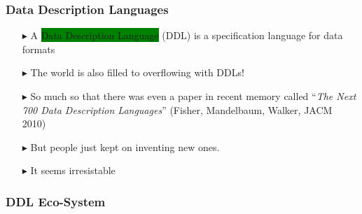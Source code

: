 \documentclass{beamer}
\newcommand{\gemph}[1]{\colorbox{green}{#1}}
\begin{document}
\begin{frame}\frametitle{Data Description Languages}

\begin{itemize}

\item [$\blacktriangleright$] A \gemph{Data Description Language}
  (DDL) is a specification language for data formats

\item [$\blacktriangleright$] The world is also filled to overflowing with DDLs!

\item [$\blacktriangleright$] So much so that there was even a paper in recent memory called
  ``\emph{The Next 700 Data Description Languages}'' (Fisher, Mandelbaum, Walker, JACM 2010)

\item [$\blacktriangleright$] But people just kept on inventing new ones.

\item [$\blacktriangleright$] It seems irresistable

\end{itemize}

\end{frame}


\begin{frame}\frametitle{DDL Eco-System}


\end{frame}


\end{document}

